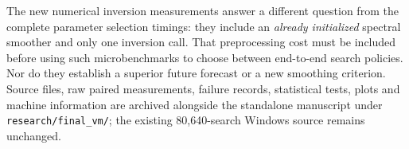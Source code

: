 
The new numerical inversion measurements answer a
different question from the complete parameter selection
timings: they include an \emph{already initialized}
spectral smoother and only one inversion call. That
preprocessing cost must be included before using such
microbenchmarks to choose between end-to-end search
policies. Nor do they establish a superior future
forecast or a new smoothing criterion. Source files,
raw paired measurements, failure records, statistical
tests, plots and machine information are archived
alongside the standalone manuscript under
\texttt{research/final\_vm/}; the existing 80,640-search
Windows source remains unchanged.
